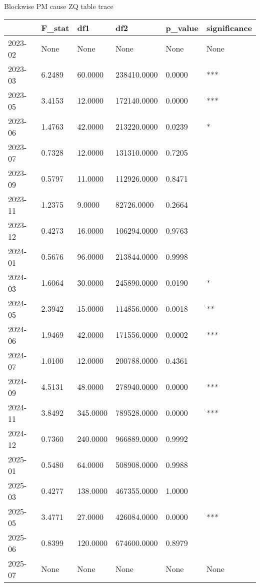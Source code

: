 Blockwise PM cause ZQ table trace

\begin{center}
  \begin{tabular}{l|l|l|l|l|l}
    \hline
  & F\_stat & df1 & df2 & p\_value & significance\\
  \hline
    2023-02 & None & None & None & None & None\\
    \hline
    2023-03 & 6.2489 & 60.0000 & 238410.0000 & 0.0000 & ***\\
    \hline
    2023-05 & 3.4153 & 12.0000 & 172140.0000 & 0.0000 & ***\\
    \hline
    2023-06 & 1.4763 & 42.0000 & 213220.0000 & 0.0239 & *\\
    \hline
    2023-07 & 0.7328 & 12.0000 & 131310.0000 & 0.7205 & \\
    \hline
    2023-09 & 0.5797 & 11.0000 & 112926.0000 & 0.8471 & \\
    \hline
    2023-11 & 1.2375 & 9.0000 & 82726.0000 & 0.2664 & \\
    \hline
    2023-12 & 0.4273 & 16.0000 & 106294.0000 & 0.9763 & \\
    \hline
    2024-01 & 0.5676 & 96.0000 & 213844.0000 & 0.9998 & \\
    \hline
    2024-03 & 1.6064 & 30.0000 & 245890.0000 & 0.0190 & *\\
    \hline
    2024-05 & 2.3942 & 15.0000 & 114856.0000 & 0.0018 & **\\
    \hline
    2024-06 & 1.9469 & 42.0000 & 171556.0000 & 0.0002 & ***\\
    \hline
    2024-07 & 1.0100 & 12.0000 & 200788.0000 & 0.4361 & \\
    \hline
    2024-09 & 4.5131 & 48.0000 & 278940.0000 & 0.0000 & ***\\
    \hline
    2024-11 & 3.8492 & 345.0000 & 789528.0000 & 0.0000 & ***\\
    \hline
    2024-12 & 0.7360 & 240.0000 & 966889.0000 & 0.9992 & \\
    \hline
    2025-01 & 0.5480 & 64.0000 & 508908.0000 & 0.9988 & \\
    \hline
    2025-03 & 0.4277 & 138.0000 & 467355.0000 & 1.0000 & \\
    \hline
    2025-05 & 3.4771 & 27.0000 & 426084.0000 & 0.0000 & ***\\
    \hline
    2025-06 & 0.8399 & 120.0000 & 674600.0000 & 0.8979 & \\
    \hline
    2025-07 & None & None & None & None & None\\
    \hline
  \end{tabular}
\end{center}


